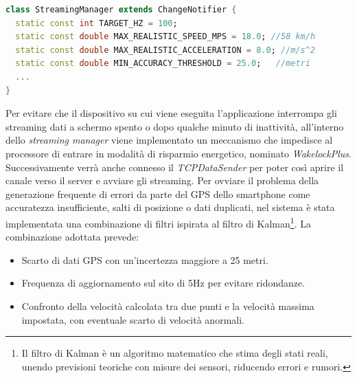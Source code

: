 \documentclass[target=bach,aauheader=,style=]{thud}
\begin{document}
\begin{lstlisting}[language=dart, caption={Costanti per il monitoraggio.}, label={sm_vars}]
class StreamingManager extends ChangeNotifier {
  static const int TARGET_HZ = 100;
  static const double MAX_REALISTIC_SPEED_MPS = 18.0; //58 km/h
  static const double MAX_REALISTIC_ACCELERATION = 8.0; //m/s^2
  static const double MIN_ACCURACY_THRESHOLD = 25.0;   //metri
  ...
}
\end{lstlisting}
Per evitare che il dispositivo su cui viene eseguita l'applicazione interrompa gli streaming dati a schermo spento o dopo qualche minuto di inattività, all'interno dello \textit{streaming manager} viene implementato un meccanismo che impedisce al processore di entrare in modalità di risparmio energetico, nominato \textit{WakelockPlus}. Successivamente verrà anche connesso il \textit{TCPDataSender} per poter così aprire il canale verso il server e avviare gli streaming. 
Per ovviare il problema della generazione frequente di errori da parte del GPS dello smartphone come accuratezza insufficiente, salti di posizione o dati duplicati, nel sistema è stata implementata una combinazione di filtri ispirata al filtro di Kalman\footnote{Il filtro di Kalman è un algoritmo matematico che stima degli stati reali, unendo previsioni teoriche con misure dei sensori, riducendo errori e rumori.}.
La combinazione adottata prevede: 
\begin{itemize}
  \item Scarto di dati GPS con un'incertezza maggiore a 25 metri.
  \item Frequenza di aggiornamento sul sito di 5Hz per evitare ridondanze.
  \item Confronto della velocità calcolata tra due punti e la velocità massima impostata, con eventuale scarto di velocità anormali.
\end{itemize}
\end{document}
